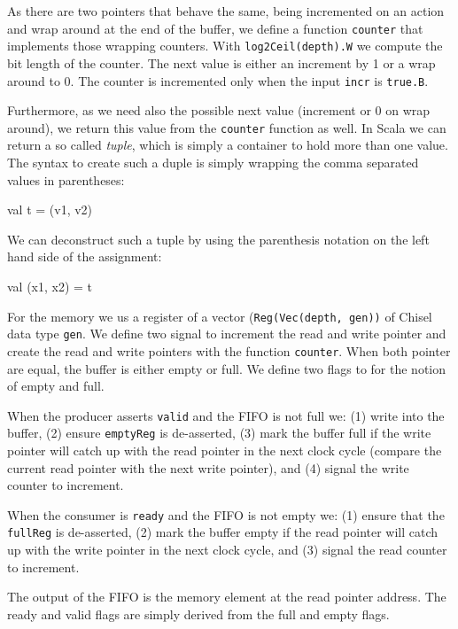 \documentclass[%
    10pt,
    headinclude, footexclude,
    openright, %
    notitlepage,
    cleardoubleempty,
    headsepline,
    pointlessnumbers,
    bibtotoc, idxtotoc,
    ]{scrbook}
\newcommand{\code}[1]{{\small{\texttt{#1}}}}
\begin{document}

As there are two pointers that behave the same, being incremented on an
action and wrap around at the end of the buffer, we define a function \code{counter}
that implements those wrapping counters. With \code{log2Ceil(depth).W} we
compute the bit length of the counter. The next value is either an increment by
1 or a wrap around to 0.
The counter is incremented only when the input \code{incr} is \code{true.B}.

Furthermore, as we need also the
possible next value (increment or 0 on wrap around), we return this value from
the \code{counter} function as well. In Scala we can return a so called \emph{tuple},
which is simply a container to hold more than one value. The syntax to create
such a duple is simply wrapping the comma separated values in parentheses:

\begin{chisel}
  val t = (v1, v2)
\end{chisel}

\noindent We can deconstruct such a tuple by using the parenthesis notation
on the left hand side of the assignment:

\begin{chisel}
val (x1, x2) = t
\end{chisel}

For the memory we us a register of a vector (\code{Reg(Vec(depth, gen))} of
Chisel data type \code{gen}. We define two signal to increment the read and
write pointer and create the read and write pointers with the function \code{counter}.
When both pointer are equal, the buffer is either empty or full.
We define two flags to for the notion of empty and full.

When the producer asserts \code{valid} and the FIFO is not full we:
(1) write into the buffer, (2) ensure \code{emptyReg} is de-asserted,
(3) mark the buffer full if the write pointer will catch up with the read pointer
in the next clock cycle (compare the current read pointer with the next
write pointer), and (4) signal the write counter to increment.

When the consumer is \code{ready} and the FIFO is not empty we:
(1) ensure that the \code{fullReg} is de-asserted, (2) mark the buffer
empty if the read pointer will catch up with the write pointer in
the next clock cycle, and (3) signal the read counter to increment.

The output of the FIFO is the memory element at the read pointer address.
The ready and valid flags are simply derived from the full and empty
flags.
\end{document}
